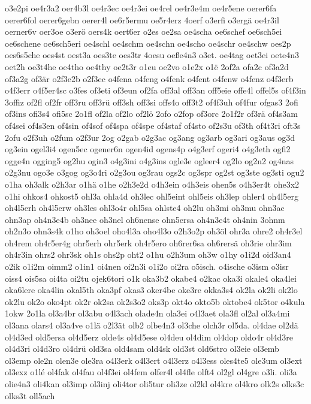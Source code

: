 {o3e2pi
oe4r3a2
oer4b3l
oe4r3ec
oe4r3ei
oe4rel
oe4r3e4m
oe4r5ene
oerer6fa
oerer6fol
oerer6gebn
oerer4l
oe6r5ermu
oe5r4erz
4oerf
o3erfi
o3ergä
oe4r3il
oerner6v
oer3oe
o3erö
oers4k
oert6er
o2es
oe2sa
oe4scha
oe6schef
oe6sch5ei
oe6schene
oe6sch5eri
oe4schl
oe4schm
oe4schn
oe4scho
oe4schr
oe4schw
oes2p
oes6s5che
oes4st
oest3a
oes3te
oes3tr
4oesu
oeße4n3
o3et.
oe4tag
oet3ei
oete4n3
oet2h
oe3t4he
oe4tho
oe4thy
oe2t3r
o1eu
oe2vo
o1e2x
o1ë
2of2a
ofa2c
of3a2d
of3a2g
of3är
o2f3e2b
o2f3ec
o4fena
o4feng
o4fenk
o4fent
o4fenw
o4fenz
o4f3erb
o4f3err
o4f5er4sc
o3fes
of3eti
of3eun
of2fa
off3al
off3an
off5eie
offe4l
offel5s
of4f3in
3offiz
of2fl
of2fr
off3ru
off3rü
off3sh
off3si
offs4o
off3t2
of4f3uh
of4fur
ofgas3
2ofi
of3ins
ofi3s4
ofi5sc
2o1fl
of2la
of2lo
of2lö
2ofo
o2fop
of3orc
2o1f2r
of3rä
of4s3am
of4sei
of4s3en
of4sin
of4sof
of4spa
of4spe
of4staf
of4sto
of2s3u
of3th
of4t3ri
oft3s
2ofu
o2f3uh
o2fum
o2f3ur
2og
o2gab
o2g3ac
og3ang
og3arb
og3ari
og3aus
og3d
og3ein
ogel3i4
ogen5ec
ogener6n
ogen4id
ogens4p
o4g3erf
ogeri4
o4g3eth
ogfi2
ogge4n
ogging5
og2hu
ogin3
o4g3ini
o4g3ins
ogle3e
ogleer4
og2lo
og2n2
og4nas
o2g3nu
ogo3e
o3gog
og3o4ri
o2g3ou
og3rau
ogs2c
og3spr
og2st
og3ste
og3sti
ogu2
o1ha
oh3alk
o2h3ar
o1hä
o1he
o2h3e2d
o4h3ein
o4h3eis
ohen5s
o4h3er4t
ohe3x2
o1hi
ohkos4
ohkost5
ohl3a
ohla4d
oh3lec
ohl5eint
ohl5eis
oh3lep
ohler4
oh4l5erg
oh4l5erh
oh4l5erw
oh3les
ohl3o4r
ohl5sa
ohlste4
oh2lu
oh3mi
oh3mu
ohn3ac
ohn3ap
oh4n3e4b
oh3nee
oh3nel
oh6nense
ohn5ersa
oh4n3e4t
oh4nin
3ohnm
oh2n3o
ohn3s4k
o1ho
oh3oel
oho4l3a
oho4l3o
o2h3o2p
oh3öl
ohr3a
ohre2
oh4r3el
oh4rem
oh4r5er4g
ohr5erh
ohr5erk
oh4r5ero
oh6rer6sa
oh6rersä
oh3rie
ohr3im
oh4r3in
ohrs2
ohr3sk
oh1s
ohs2p
oht2
o1hu
o2h3um
oh3w
o1hy
o1i2d
oid3an4
o2ik
o1i2m
oimm2
o1in1
oi4nen
oi2n3i
o1i2o
oi2ra
o5isch.
o4ische
o3ism
o3isr
oiss4
ois5sa
oi4ta
oi2tu
ojek6tori
o1k
oka3b2
okabe4
o2kac
oka3i
okale4
oka4lei
oka6lere
oka4lin
okal5th
oka3pf
okas3
oker4be
oke3re
okka3s4
ok2la
ok2li
ok2lo
ok2lu
ok2o
oko4pt
ok2r
ok2sa
ok2s3o2
oks3p
okt4o
okto5b
oktobe4
ok5tor
o4kula
1okw
2o1la
ol3a4br
ol3abu
o4l3ach
olade4n
ola3ei
o4l3aet
ola3fl
ol2al
ol3a4mi
ol3ana
olars4
ol3a4ve
o1lä
o2l3ät
olb2
olbe4n3
ol3che
olch3r
ol5da.
ol4dae
ol2dä
ol4d3ed
old5ersa
ol4d5erz
olde4s
ol4d5ese
ol4deu
ol4dim
ol4dop
oldo4r
ol4d3re
ol4d3ri
ol4d3ro
ol4drü
old3sa
old4sam
old4sk
old3st
old6stro
ol3eie
ol3emb
ol3emp
ole2n
olen3e
ole3ra
o4l3erk
o4l3ert
o4l3erz
o4l3ess
oles4te5
ole3um
ol3ext
ol3exz
o1lé
ol4fak
ol4fau
ol4f3ei
ol4fem
olfer4l
ol4fle
olft4
ol2gl
ol4gre
o3li.
oli3a
olie4n3
oli4kan
ol3imp
ol3inj
oli4tor
oli5tur
oli3ze
ol2kl
ol4kre
ol4kro
olk2s
olks3c
olks3t
oll5ach
}
